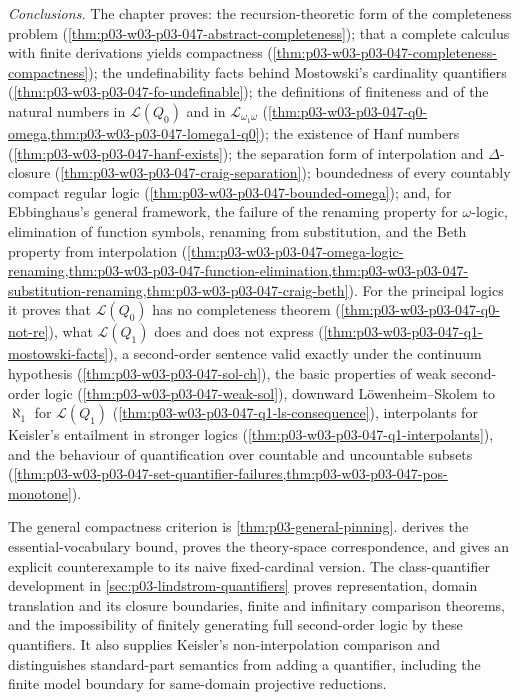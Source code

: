 \emph{Conclusions.} The chapter proves: the recursion-theoretic form of the
completeness problem (\cref{thm:p03-w03-p03-047-abstract-completeness}); that
a complete calculus with finite derivations yields compactness
(\cref{thm:p03-w03-p03-047-completeness-compactness}); the undefinability
facts behind Mostowski's cardinality quantifiers
(\cref{thm:p03-w03-p03-047-fo-undefinable}); the definitions of finiteness and
of the natural numbers in \(\mathscr L(Q_0)\) and in
\(\mathscr L_{\omega_1\omega}\)
(\cref{thm:p03-w03-p03-047-q0-omega,thm:p03-w03-p03-047-lomega1-q0}); the
existence of Hanf numbers (\cref{thm:p03-w03-p03-047-hanf-exists}); the
separation form of interpolation and \(\Delta\)-closure
(\cref{thm:p03-w03-p03-047-craig-separation}); boundedness of every
countably compact regular logic (\cref{thm:p03-w03-p03-047-bounded-omega});
and, for Ebbinghaus's general framework, the failure of the renaming
property for \(\omega\)-logic, elimination of function symbols, renaming
from substitution, and the Beth property from interpolation
(\cref{thm:p03-w03-p03-047-omega-logic-renaming,thm:p03-w03-p03-047-function-elimination,thm:p03-w03-p03-047-substitution-renaming,thm:p03-w03-p03-047-craig-beth}).
For the principal logics it proves that \(\mathscr L(Q_0)\) has no
completeness theorem (\cref{thm:p03-w03-p03-047-q0-not-re}), what
\(\mathscr L(Q_1)\) does and does not express
(\cref{thm:p03-w03-p03-047-q1-mostowski-facts}), a second-order sentence
valid exactly under the continuum hypothesis
(\cref{thm:p03-w03-p03-047-sol-ch}), the basic properties of weak
second-order logic (\cref{thm:p03-w03-p03-047-weak-sol}), downward
L\"owenheim--Skolem to \(\aleph_1\) for \(\mathscr L(Q_1)\)
(\cref{thm:p03-w03-p03-047-q1-ls-consequence}), interpolants for Keisler's
entailment in stronger logics (\cref{thm:p03-w03-p03-047-q1-interpolants}),
and the behaviour of quantification over countable and uncountable subsets
(\cref{thm:p03-w03-p03-047-set-quantifier-failures,thm:p03-w03-p03-047-pos-monotone}).

The general compactness criterion is \cref{thm:p03-general-pinning}.
 derives the essential-vocabulary
bound, proves the theory-space correspondence, and gives an explicit
counterexample to its naive fixed-cardinal version.
The class-quantifier development in \cref{sec:p03-lindstrom-quantifiers}
proves representation, domain translation and its closure boundaries,
finite and infinitary comparison theorems, and the impossibility of
finitely generating full second-order logic by these quantifiers.
It also supplies Keisler's non-interpolation comparison and distinguishes
standard-part semantics from adding a quantifier, including the finite
model boundary for same-domain projective reductions.

